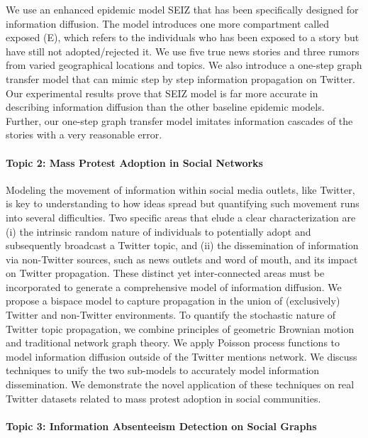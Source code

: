 We use an enhanced epidemic model SEIZ that has been specifically designed for information diffusion. The model introduces one more compartment called exposed (E), which refers to the individuals who has been exposed to a story but have still not adopted/rejected it. We use five true news stories and three rumors from varied geographical locations and topics. We also introduce a one-step graph transfer model that can mimic step by step information propagation on Twitter. Our experimental results prove that SEIZ model is far more accurate in describing information diffusion than the other baseline epidemic models. Further, our one-step graph transfer model imitates information cascades of the stories with a very reasonable error.

\paragraph{Topic 2: Mass Protest Adoption in Social Networks}

Modeling the movement of information within social media outlets, like
Twitter, is key to understanding to how ideas spread but quantifying such
movement runs into several difficulties. Two specific areas that elude a clear
characterization are (i) the intrinsic random nature of individuals to
potentially adopt and subsequently broadcast a Twitter topic, and (ii) the
dissemination of information via non-Twitter sources, such as news outlets
and word of mouth, and its impact on Twitter propagation. These distinct
yet inter-connected areas must be incorporated to generate a
comprehensive model of information diffusion. We propose a bispace model
to capture propagation in the union of (exclusively) Twitter and
non-Twitter environments. To quantify the stochastic nature of Twitter
topic propagation, we combine principles of geometric Brownian motion and
traditional network graph theory. We apply Poisson process functions to model
information diffusion outside of the Twitter mentions network. We discuss techniques
to unify the two sub-models to accurately model information dissemination. We
demonstrate the novel application of these techniques on real
Twitter datasets related to mass protest adoption in social communities.

\paragraph{Topic 3: Information Absenteeism Detection on Social Graphs}

